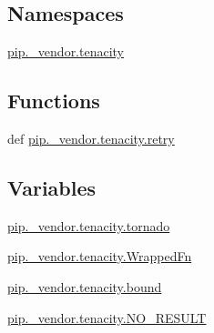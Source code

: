\subsection*{Namespaces}
\begin{DoxyCompactItemize}
\item 
 \hyperlink{namespacepip_1_1__vendor_1_1tenacity}{pip.\+\_\+vendor.\+tenacity}
\end{DoxyCompactItemize}
\subsection*{Functions}
\begin{DoxyCompactItemize}
\item 
def \hyperlink{namespacepip_1_1__vendor_1_1tenacity_a0acaaa84961d4d70551f0d7a5662581d}{pip.\+\_\+vendor.\+tenacity.\+retry}
\end{DoxyCompactItemize}
\subsection*{Variables}
\begin{DoxyCompactItemize}
\item 
\hyperlink{namespacepip_1_1__vendor_1_1tenacity_a353eae01e9dbe7bef6a704aae9556feb}{pip.\+\_\+vendor.\+tenacity.\+tornado}
\item 
\hyperlink{namespacepip_1_1__vendor_1_1tenacity_a8f769ca8e15c471b0617bc0906a9a517}{pip.\+\_\+vendor.\+tenacity.\+Wrapped\+Fn}
\item 
\hyperlink{namespacepip_1_1__vendor_1_1tenacity_a3bc11dbe8d716bd870e3c568faf6491c}{pip.\+\_\+vendor.\+tenacity.\+bound}
\item 
\hyperlink{namespacepip_1_1__vendor_1_1tenacity_a030166783be14a9ba79952b354231a82}{pip.\+\_\+vendor.\+tenacity.\+N\+O\+\_\+\+R\+E\+S\+U\+LT}
\end{DoxyCompactItemize}
